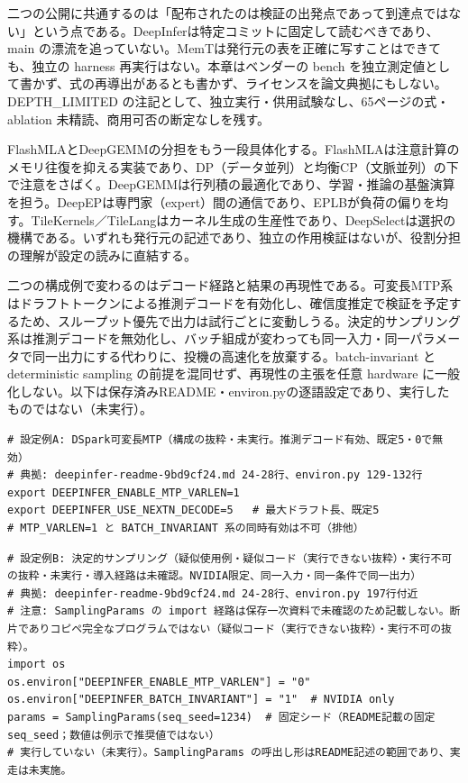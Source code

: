 \documentclass[lualatex,a4paper,10pt]{jlreq}
\begin{document}
二つの公開に共通するのは「配布されたのは検証の出発点であって到達点ではない」という点である。DeepInferは特定コミットに固定して読むべきであり、main の漂流を追っていない。MemTは発行元の表を正確に写すことはできても、独立の harness 再実行はない。本章はベンダーの bench を独立測定値として書かず、式の再導出があるとも書かず、ライセンスを論文典拠にもしない。DEPTH\_LIMITED の注記として、独立実行・供用試験なし、65ページの式・ablation 未精読、商用可否の断定なしを残す。


FlashMLAとDeepGEMMの分担をもう一段具体化する。FlashMLAは注意計算のメモリ往復を抑える実装であり、DP（データ並列）と均衡CP（文脈並列）の下で注意をさばく。DeepGEMMは行列積の最適化であり、学習・推論の基盤演算を担う。DeepEPは専門家（expert）間の通信であり、EPLBが負荷の偏りを均す。TileKernels／TileLangはカーネル生成の生産性であり、DeepSelectは選択の機構である。いずれも発行元の記述であり、独立の作用検証はないが、役割分担の理解が設定の読みに直結する。


二つの構成例で変わるのはデコード経路と結果の再現性である。可変長MTP系はドラフトトークンによる推測デコードを有効化し、確信度推定で検証を予定するため、スループット優先で出力は試行ごとに変動しうる。決定的サンプリング系は推測デコードを無効化し、バッチ組成が変わっても同一入力・同一パラメータで同一出力にする代わりに、投機の高速化を放棄する。batch-invariant と deterministic sampling の前提を混同せず、再現性の主張を任意 hardware に一般化しない。以下は保存済みREADME・environ.pyの逐語設定であり、実行したものではない（未実行）。


\begin{verbatim}
# 設定例A: DSpark可変長MTP（構成の抜粋・未実行。推測デコード有効、既定5・0で無効）
# 典拠: deepinfer-readme-9bd9cf24.md 24-28行、environ.py 129-132行
export DEEPINFER_ENABLE_MTP_VARLEN=1
export DEEPINFER_USE_NEXTN_DECODE=5   # 最大ドラフト長、既定5
# MTP_VARLEN=1 と BATCH_INVARIANT 系の同時有効は不可（排他）
\end{verbatim}


\begin{verbatim}
# 設定例B: 決定的サンプリング（疑似使用例・疑似コード（実行できない抜粋）・実行不可の抜粋・未実行・導入経路は未確認。NVIDIA限定、同一入力・同一条件で同一出力）
# 典拠: deepinfer-readme-9bd9cf24.md 24-28行、environ.py 197行付近
# 注意: SamplingParams の import 経路は保存一次資料で未確認のため記載しない。断片でありコピペ完全なプログラムではない（疑似コード（実行できない抜粋）・実行不可の抜粋）。
import os
os.environ["DEEPINFER_ENABLE_MTP_VARLEN"] = "0"
os.environ["DEEPINFER_BATCH_INVARIANT"] = "1"  # NVIDIA only
params = SamplingParams(seq_seed=1234)  # 固定シード（README記載の固定 seq_seed；数値は例示で推奨値ではない）
# 実行していない（未実行）。SamplingParams の呼出し形はREADME記述の範囲であり、実走は未実施。
\end{verbatim}
\end{document}
